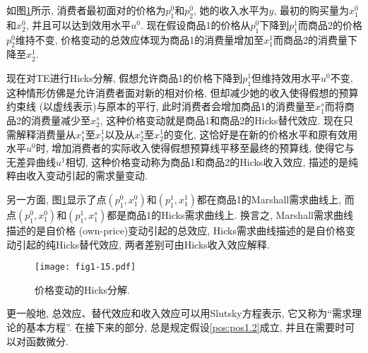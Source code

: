 \documentclass[cn, 12pt, math=mtpro2, bibstyle=apa, blue]{elegantbook}
\begin{document}
如图\ref{fig1.15}所示, 消费者最初面对的价格为$p_1^0$和$p_2^0$, 她的收入水平为$y$, 最初的购买量为$x_1^0$和$x_2^0$, 并且可以达到效用水平$u^0$. 现在假设商品1的价格从$p_1^0$下降到$p_1^1$而商品2的价格$p_2^0$维持不变, 价格变动的总效应体现为商品1的消费量增加至$x_1^1$而商品2的消费量下降至$x_2^1$.

现在对TE进行Hicks分解, 假想允许商品1的价格下降到$p_1^1$但维持效用水平$u^0$不变, 这种情形仿佛是允许消费者面对新的相对价格, 但却减少她的收入使得假想的预算约束线 (以虚线表示)与原本的平行, 此时消费者会增加商品1的消费量至$x_1^s$而将商品2的消费量减少至$x_2^s$, 这种价格变动就是商品1和商品2的Hicks替代效应. 现在只需解释消费量从$x_1^s$至$x_1^1$以及从$x_2^s$至$x_2^1$的变化, 这恰好是在新的价格水平和原有效用水平$u^0$时, 增加消费者的实际收入使得假想预算线平移至最终的预算线, 使得它与无差异曲线$u^1$相切, 这种价格变动称为商品1和商品2的Hicks收入效应, 描述的是纯粹由收入变动引起的需求量变动.

另一方面, 图\ref{fig1.15}显示了点$(p_1^0,x_1^0)$和$(p_1^1,x_1^1)$都在商品1的Marshall需求曲线上, 而点$(p_1^0,x_1^0)$和$(p_1^1,x_1^s)$都是商品1的Hicks需求曲线上. 换言之, Marshall需求曲线描述的是自价格 (own-price)变动引起的总效应, Hicks需求曲线描述的是自价格变动引起的纯Hicks替代效应, 两者差别可由Hicks收入效应解释.
\begin{figure}
  \centering
  \texttt{[image: fig1-15.pdf]}
  \caption{价格变动的Hicks分解.}\label{fig1.15}
\end{figure}

更一般地, 总效应、替代效应和收入效应可以用Slutsky方程表示, 它又称为“需求理论的基本方程”. 在接下来的部分, 总是规定假设\ref{pos:pos1.2}成立, 并且在需要时可以对函数微分.
\end{document}
